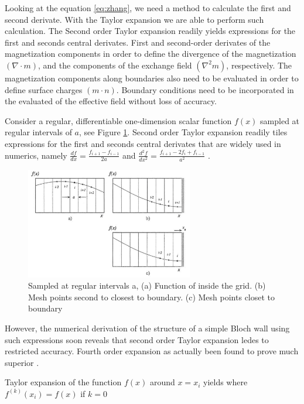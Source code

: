 Looking at the equation \ref{eq:zhang}, we need a method to calculate the first and second derivate. With the Taylor expansion we are able to perform such calculation. The Second order Taylor expansion readily yields expressions for the first and seconds central derivates. First and second-order derivates of the magnetization components in order to define the divergence  of the magnetization $(\nabla \cdot m)$, and the components of the exchange field $(\nabla^2m)$, respectively. The magnetization components along boundaries also need to be evaluated in order to define surface charges $(m \cdot n)$. Boundary conditions need to be incorporated in the evaluated of the effective field without loss of accuracy. 

Consider a regular, differentiable one-dimension scalar function $f(x)$ sampled at regular intervals of $a$, see Figure  \ref{fig:bound}. Second order Taylor expansion readily tiles expressions for the first and seconds central derivates that are widely used in numerics, namely $\frac{df}{dx} = \frac{f_{i+1} - f_{i-1}}{2a}$ and $\frac{d^2f}{dx^2} = \frac{f_{i+1} - 2f_i + f_{i-1}}{a^2}$ \cite{methods}.

\begin{figure}[htbp]
	\centering
		\includegraphics[width=0.65\textwidth]{Figures/bound.png}
		\smallskip
	\caption[Sampled at regular intervals a, Taylor expansion]{Sampled at regular intervals a, (a) Function of inside the grid. (b) Mesh points second to closest to boundary. (c) Mesh points closet to boundary}
	\label{fig:bound}
\end{figure}

However, the numerical derivation of the structure of a simple Bloch wall using such expressions soon reveals that second order Taylor expansion ledes to restricted accuracy. Fourth order expansion as actually been found to prove much superior \cite{methods}.

Taylor expansion of the function $f(x)$ around $x=x_i$ yields where $f^{(k)}(x_i) = f(x)$ if $k=0$

